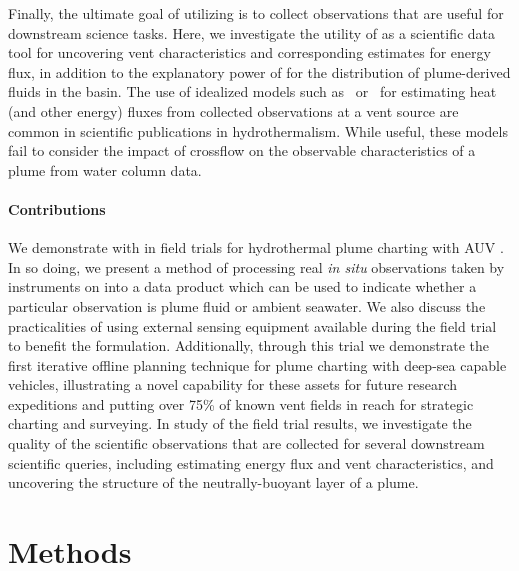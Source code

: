 Finally, the ultimate goal of utilizing \PHORTEX is to collect observations that are useful for downstream science tasks. Here, we investigate the utility of \PHUMES as a scientific data tool for uncovering vent characteristics and corresponding estimates for energy flux, in addition to the explanatory power of \PHUMES for the distribution of plume-derived fluids in the basin. The use of idealized models such as~\cite{morton1956turbulent} or~\cite{speer1989model} for estimating heat (and other energy) fluxes from collected observations at a vent source are common in scientific publications in hydrothermalism\autocite{barreyre2012structure,wilson1996hydrothermal,mittelstaedt2012quantifying,baker1993method,ramondenc2006first}. While useful, these models fail to consider the impact of crossflow on the observable characteristics of a plume from water column data.



\paragraph{Contributions}
We demonstrate \PHORTEX with \PHUMES in field trials for hydrothermal plume charting with AUV \Sentry. In so doing, we present a method of processing real \emph{in situ} observations taken by instruments on \Sentry into a data product which can be used to indicate whether a particular observation is plume fluid or ambient seawater. We also discuss the practicalities of using external sensing equipment available during the field trial to benefit the \PHUMES formulation. Additionally, through this trial we demonstrate the first iterative offline planning technique for plume charting with deep-sea capable vehicles, illustrating a novel capability for these assets for future research expeditions and putting over 75\% of known vent fields\autocite{beaulieu2013authoritative} in reach for strategic charting and surveying. In study of the field trial results, we investigate the quality of the scientific observations that are collected for several downstream scientific queries, including estimating energy flux and vent characteristics, and uncovering the structure of the neutrally-buoyant layer of a plume.

\section{Methods}
\label{sec:field_methods}

